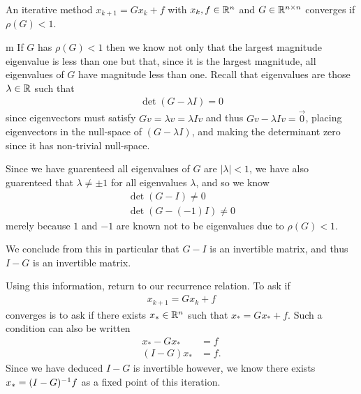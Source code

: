 \documentclass[11pt]{article}
\begin{document}
\begin{proposition}
An iterative method $x_{k+1} = Gx_k + f$ with $x_{k},f \in \mathbb{R}^n$ and $G \in \mathbb{R}^{n \times n}$ converges if $\rho(G) < 1$.
\end{proposition}

\begin{my proof}{m}
If $G$ has $\rho(G) < 1$ then we know not only that the largest magnitude eigenvalue is less than one but that, since it is the largest magnitude, all eigenvalues of $G$ have magnitude less than one. Recall that eigenvalues are those $\lambda \in \mathbb{R}$ such that \begin{gather*}
\det(G - \lambda I) = 0
\end{gather*}
since eigenvectors must satisfy $Gv = \lambda v = \lambda I v$ and thus $Gv - \lambda I v = \vec 0$, placing eigenvectors in the null-space of $(G - \lambda I)$, and making the determinant zero since it has non-trivial null-space.

Since we have guarenteed all eigenvalues of $G$ are $|\lambda| < 1$, we have also guarenteed that $\lambda \neq \pm 1$ for all eigenvalues $\lambda$, and so we know \begin{gather*}
\det(G - I) \neq 0 \\
\det(G - (-1)I) \neq 0 
\end{gather*}
merely because $1$ and $-1$ are known not to be eigenvalues due to $\rho(G) < 1$.

We conclude from this in particular that $G - I$ is an invertible matrix, and thus $I - G$ is an invertible matrix.

Using this information, return to our recurrence relation. To ask if \begin{gather*}
x_{k+1} = G x_k + f
\end{gather*}
converges is to ask if there exists $x_* \in \mathbb{R}^n$ such that $x_* = G x_* + f$. Such a condition can also be written \begin{align*}
x_* - G x_* & = f\\
(I - G) x_* &= f.
\end{align*}
Since we have deduced $I - G$ is invertible however, we know there exists $x_* = (I - G)^{-1} f$ as a fixed point of this iteration.


\end{my proof}
\end{document}

